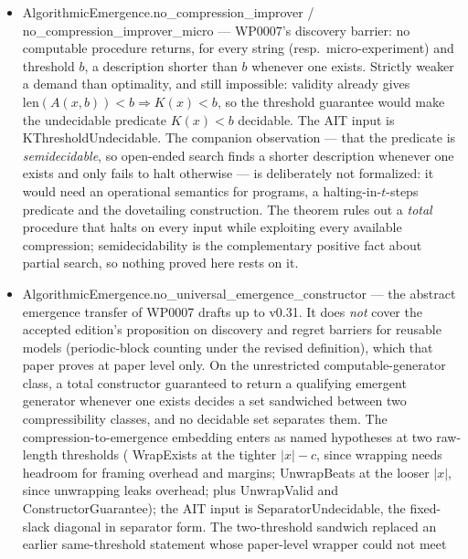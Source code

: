 \documentclass[11pt,a4paper]{article}
\newcommand{\lean}[1]{{\ttfamily\small
  \let\leanunderscore\_\def\_{\leanunderscore\allowbreak}#1}}
\begin{document}
\begin{itemize}[leftmargin=1.4em,itemsep=1pt]
universal compressor, so ``no universal compressor'' \emph{implies} ``no threshold procedure''.
The raw-length statement is the stronger one and is \textbf{not} a corollary of the
arbitrary-$b$ theorem; the converse fails, since a procedure required to work only at $b=|x|$ is a
weaker object than one required to work at every $b$.
\item \lean{AlgorithmicEmergence.no\_compression\_improver} /
\lean{no\_compression\_improver\_micro} --- WP0007's discovery barrier: no computable
procedure returns, for every string (resp.\ micro-experiment) and threshold $b$, a description
shorter than $b$ whenever one exists. Strictly weaker a demand than optimality, and still
impossible: validity already gives $\mathrm{len}(A(x,b))<b \Rightarrow K(x)<b$, so the threshold
guarantee would make the undecidable predicate $K(x)<b$ decidable. The AIT input is
\lean{KThresholdUndecidable}. The companion observation --- that the predicate is
\emph{semidecidable}, so open-ended search finds a shorter description whenever one exists and
only fails to halt otherwise --- is deliberately not formalized: it would need an operational
semantics for programs, a halting-in-$t$-steps predicate and the dovetailing construction. The
theorem rules out a \emph{total} procedure that halts on every input while exploiting every
available compression; semidecidability is the complementary positive fact about partial search,
so nothing proved here rests on it.
\item \lean{AlgorithmicEmergence.no\_universal\_emergence\_constructor} --- the abstract
emergence transfer of WP0007 drafts up to v0.31. It does \emph{not} cover the accepted edition's
proposition on discovery and regret barriers for reusable models (periodic-block counting under
the revised definition), which that paper proves at
paper level only. On the unrestricted computable-generator class, a total constructor
guaranteed to return a qualifying emergent generator whenever one exists decides a set sandwiched
between two compressibility classes, and no decidable set separates them. The
compression-to-emergence embedding enters as named hypotheses at two raw-length thresholds
(\lean{WrapExists} at the tighter $|x|-c$, since wrapping needs headroom for framing overhead
and margins; \lean{UnwrapBeats} at the looser $|x|$, since unwrapping leaks overhead; plus
\lean{UnwrapValid} and \lean{ConstructorGuarantee}); the AIT input is
\lean{SeparatorUndecidable}, the fixed-slack diagonal in separator form. The two-threshold
sandwich replaced an earlier same-threshold statement whose paper-level wrapper could not meet

\end{itemize}
\end{document}
